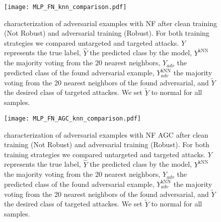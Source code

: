 \begin{figure}[htbp]
	\centering
	\texttt{[image: MLP\_FN\_knn\_comparison.pdf]}
	\caption[ characterization of adversarial examples with  NF]{ characterization of adversarial examples with  NF after clean training (Not Robust) and adversarial training (Robust). For both training strategies we compared untargeted and targeted attacks. \(Y\) represents the true label, \(\hat{Y}\) the predicted class by the model, \(Y^{\text{kNN}}\) the majority voting from the 20 nearest neighbors, \(\hat{Y}_{adv}\) the predicted class of the found adversarial example, \(Y^{\text{kNN}}_{adv}\) the majority voting from the 20 nearest neighbors of the found adversarial, and \(\tilde{Y}\) the desired class of targeted attackes. We set \(\tilde{Y}\) to normal for all samples.}\label{fig:mlp_fn_knn_comp}
\end{figure}

\begin{figure}[htbp]
	\centering
	\texttt{[image: MLP\_FN\_AGC\_knn\_comparison.pdf]}
	\caption[ characterization of adversarial examples with  NF AGC]{ characterization of adversarial examples with  NF AGC after clean training (Not Robust) and adversarial training (Robust). For both training strategies we compared untargeted and targeted attacks. \(Y\) represents the true label, \(\hat{Y}\) the predicted class by the model, \(Y^{\text{kNN}}\) the majority voting from the 20 nearest neighbors, \(\hat{Y}_{adv}\) the predicted class of the found adversarial example, \(Y^{\text{kNN}}_{adv}\) the majority voting from the 20 nearest neighbors of the found adversarial, and \(\tilde{Y}\) the desired class of targeted attackes. We set \(\tilde{Y}\) to normal for all samples.}\label{fig:mlp_fnagc_knn_comp}
\end{figure}